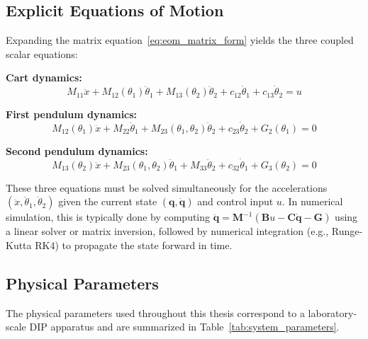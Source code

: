 \subsection{Explicit Equations of Motion}

Expanding the matrix equation~\eqref{eq:eom_matrix_form} yields the three coupled scalar equations:

\textbf{Cart dynamics:}
\begin{equation}
M_{11} \ddot{x} + M_{12}(\theta_1) \ddot{\theta}_1 + M_{13}(\theta_2) \ddot{\theta}_2 + c_{12}\dot{\theta}_1 + c_{13}\dot{\theta}_2 = u
\label{eq:cart_eom}
\end{equation}

\textbf{First pendulum dynamics:}
\begin{equation}
M_{12}(\theta_1) \ddot{x} + M_{22} \ddot{\theta}_1 + M_{23}(\theta_1, \theta_2) \ddot{\theta}_2 + c_{23}\dot{\theta}_2 + G_2(\theta_1) = 0
\label{eq:pend1_eom}
\end{equation}

\textbf{Second pendulum dynamics:}
\begin{equation}
M_{13}(\theta_2) \ddot{x} + M_{23}(\theta_1, \theta_2) \ddot{\theta}_1 + M_{33} \ddot{\theta}_2 + c_{32}\dot{\theta}_1 + G_3(\theta_2) = 0
\label{eq:pend2_eom}
\end{equation}

These three equations must be solved simultaneously for the accelerations $(\ddot{x}, \ddot{\theta}_1, \ddot{\theta}_2)$ given the current state $(\mathbf{q}, \dot{\mathbf{q}})$ and control input $u$. In numerical simulation, this is typically done by computing $\ddot{\mathbf{q}} = \mathbf{M}^{-1}(\mathbf{B}u - \mathbf{C}\dot{\mathbf{q}} - \mathbf{G})$ using a linear solver or matrix inversion, followed by numerical integration (e.g., Runge-Kutta RK4) to propagate the state forward in time.

\subsection{Physical Parameters}

The physical parameters used throughout this thesis correspond to a laboratory-scale DIP apparatus and are summarized in Table~\ref{tab:system_parameters}.

